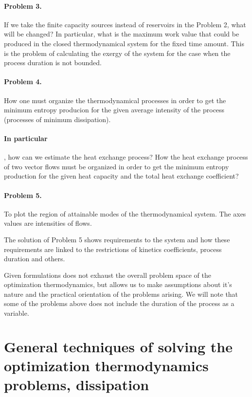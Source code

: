\documentclass[epjST]{svjour}
\begin{document}
\paragraph{Problem 3.} If we take the finite capacity sources instead of reservoirs in the Problem 2, what will be changed? In particular, what is the maximum work value that could be produced in the closed thermodynamical system for the fixed time amount. This is the problem of calculating the exergy of the system for the case when the process duration is not bounded.

\paragraph{Problem 4.} How one must organize the thermodynamical processes in order to get the minimum entropy producion for the given average intensity of the process (processes of minimum dissipation).

\paragraph{In particular}, how can we estimate the heat exchange process? How the heat exchange process of two vector flows must be organized in order to get the minimum entropy production for the given heat capacity and the total heat exchange coefficient?

\paragraph{Problem 5.} To plot the region of attainable modes of the thermodynamical system. The axes values are intensities of flows.

The solution of Problem 5 shows requirements to the system and how these requirements are linked to the restrictions of kinetics coefficients, process duration and others.

Given formulations does not exhaust the overall problem space of the optimization thermodynamics, but allows us to make assumptions about it's nature and the practical orientation of the problems arising. We will note that some of the problems above does not include the duration of the process as a variable.

\section{General techniques of solving the optimization thermodynamics problems, dissipation}
\end{document}
